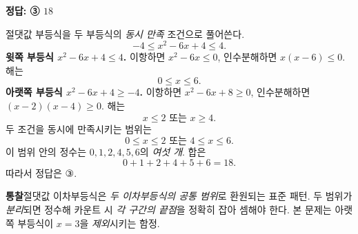 \documentclass[10pt]{article}
\newcommand{\solnote}[1]{\par\smallskip\noindent
  \begin{tcolorbox}[enhanced, breakable, colback=vB-light, colframe=vB-light,
    boxrule=0pt, arc=3pt, left=10pt, right=10pt, top=4pt, bottom=4pt,
    fontupper=\sffamily\footnotesize\color{vB-ink}]
    \textbf{\color{vB-deep}통찰}\quad #1
  \end{tcolorbox}}
\begin{document}
\begin{answerbox}\sffamily\bfseries 정답: ③ $18$\end{answerbox}
 절댓값 부등식을 두 부등식의 \emph{동시 만족} 조건으로 풀어쓴다.
\[ -4 \le x^2 - 6x + 4 \le 4. \]
 \textbf{윗쪽 부등식 $x^2 - 6x + 4 \le 4$.} 이항하면 $x^2 - 6x \le 0$, 인수분해하면 $x(x-6) \le 0$. 해는
\[ 0 \le x \le 6. \]
 \textbf{아랫쪽 부등식 $x^2 - 6x + 4 \ge -4$.} 이항하면 $x^2 - 6x + 8 \ge 0$, 인수분해하면 $(x - 2)(x - 4) \ge 0$. 해는
\[ x \le 2 \text{ 또는 } x \ge 4. \]
 두 조건을 동시에 만족시키는 범위는
\[ 0 \le x \le 2 \text{ 또는 } 4 \le x \le 6. \]
 이 범위 안의 정수는 $0, 1, 2, 4, 5, 6$의 \emph{여섯 개}. 합은
\[ 0 + 1 + 2 + 4 + 5 + 6 = 18. \]
따라서 정답은 $\textbf{③}$.
\solnote{절댓값 이차부등식은 \emph{두 이차부등식의 공통 범위}로 환원되는 표준 패턴. 두 범위가 \emph{분리}되면 정수해 카운트 시 \emph{각 구간의 끝점}을 정확히 잡아 셈해야 한다. 본 문제는 아랫쪽 부등식이 $x = 3$을 \emph{제외}시키는 함정.}
\end{document}
